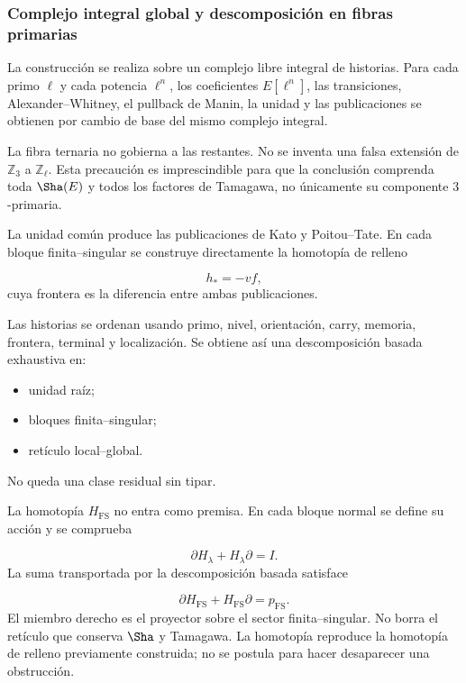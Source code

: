 \subsubsection{Complejo integral global y descomposición en fibras primarias}
La construcción se realiza sobre un complejo libre integral de historias. Para cada primo \(\ell\) y cada potencia \(\ell^n\), los coeficientes \(E[\ell^n]\), las transiciones, Alexander–Whitney, el pullback de Manin, la unidad y las publicaciones se obtienen por cambio de base del mismo complejo integral.\par
La fibra ternaria no gobierna a las restantes. No se inventa una falsa extensión de \(\mathbb Z_3\) a \(\mathbb Z_\ell\). Esta precaución es imprescindible para que la conclusión comprenda toda \(\Sha(E)\) y todos los factores de Tamagawa, no únicamente su componente \(3\)-primaria.\par
La unidad común produce las publicaciones de Kato y Poitou–Tate. En cada bloque finita–singular se construye directamente la homotopía de relleno\par
\[
h_*=-vf,
\]
cuya frontera es la diferencia entre ambas publicaciones.\par
Las historias se ordenan usando primo, nivel, orientación, carry, memoria, frontera, terminal y localización. Se obtiene así una descomposición basada exhaustiva en:\par
\begin{itemize}
\item unidad raíz;
\item bloques finita–singular;
\item retículo local–global.
\end{itemize}
No queda una clase residual sin tipar.\par
La homotopía \(H_{\mathrm{FS}}\) no entra como premisa. En cada bloque normal se define su acción y se comprueba\par
\[
\partial H_\lambda+H_\lambda\partial=I.
\]
La suma transportada por la descomposición basada satisface\par
\[
\partial H_{\mathrm{FS}}
+
H_{\mathrm{FS}}\partial
=
p_{\mathrm{FS}}.
\]
El miembro derecho es el proyector sobre el sector finita–singular. No borra el retículo que conserva \(\Sha\) y Tamagawa. La homotopía reproduce la homotopía de relleno previamente construida; no se postula para hacer desaparecer una obstrucción.\par
{}
